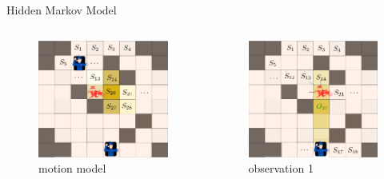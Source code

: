 \documentclass{beamer}
\theoremstyle{remark}
\begin{document}
\begin{frame}{Hidden Markov Model}
\begin{columns}
\begin{column}{.33\textwidth}
\begin{figure}
				\includegraphics[width=0.9\linewidth]{motion.png}
				\vspace{-10pt}
				\caption*{\tiny motion model}
			\end{figure}
		\end{column}
	\begin{column}{.33\textwidth}
		\begin{figure}
			\includegraphics[width=0.9\linewidth]{observation1.png}
			\vspace{-10pt}
			\caption*{\tiny observation 1}


\end{figure}
\end{column}
\end{columns}
\end{frame}
\end{document}
